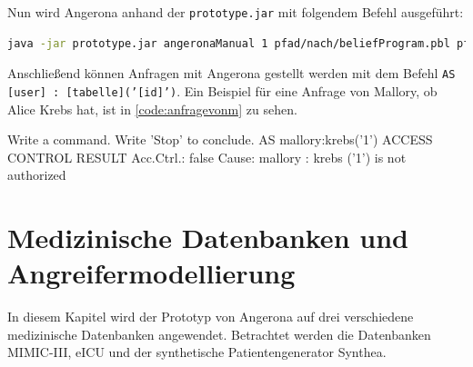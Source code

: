 \documentclass[german,version-2020-11]{uzl-thesis}
\begin{document}
Nun wird Angerona anhand der \texttt{prototype.jar} mit folgendem Befehl ausgeführt:
\begin{lstlisting}[language=bash]
java -jar prototype.jar angeronaManual 1 pfad/nach/beliefProgram.pbl pfad/nach/initStatements.txt pfad/nach/template.cpt
\end{lstlisting}
Anschließend können Anfragen mit Angerona gestellt werden mit dem Befehl \texttt{AS [user] : [tabelle]('[id]')}. Ein Beispiel für eine Anfrage von Mallory, ob Alice Krebs hat, ist in \autoref{code:anfragevonm} zu sehen.
\begin{Pseudocode}[caption={Angerona: Anfrage von Mallory ob Alice Krebs hat } , label = {code:anfragevonm} , numbers=left]
Write a command. Write 'Stop' to conclude.
AS mallory:krebs('1')
ACCESS CONTROL RESULT
Acc.Ctrl.: false Cause: mallory : krebs ('1') is not authorized
\end{Pseudocode}

\chapter{Medizinische Datenbanken und Angreifermodellierung}\label{chap:Modellierung}
In diesem Kapitel wird der Prototyp von Angerona auf drei verschiedene medizinische Datenbanken angewendet. Betrachtet werden die Datenbanken MIMIC-III, eICU und der synthetische Patientengenerator Synthea.
\end{document}
